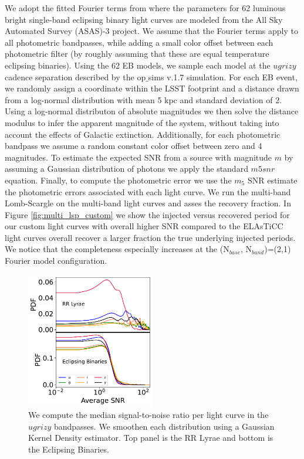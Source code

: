 \documentclass[DM,authoryear,toc]{lsstdoc}
\begin{document}
We adopt the fitted Fourier terms from \citet{Deb:Deb11} where the parameters for 62 luminous bright single-band eclipsing binary light curves are modeled from the All Sky Automated Survey
(ASAS)-3 project.
We assume that the Fourier terms apply to all photometric bandpasses, while adding a small color offset between each photometric filter (by roughly assuming that these are equal temperature eclipsing binaries).
Using the 62 EB models, we sample each model at the $ugrizy$ cadence separation described by the op$\_$sims v.1.7 simulation.
For each EB event, we randomly assign a coordinate within the LSST footprint and a distance drawn from a log-normal distribution with mean 5 kpc and standard deviation of 2.
Using a log-normal distributon of absolute magnitudes we then solve the distance modulus to infer the apparent magnitude of the system, without taking into account the effects of Galactic extinction.
Additionally, for each photometric bandpass we assume a random constant color offset between zero and 4 magnitudes.
To estimate the expected SNR from a source with magnitude $m$ by assuming a Gaussian distribution of photons we apply the standard $m5snr$ equation.
Finally, to compute the photometric error we use the $m_5$ SNR estimate the photometric errors associated with each light curve.
We run the multi-band Lomb-Scargle on the multi-band light curves and asses the recovery fraction.
In Figure \ref{fig:multi_lsp_custom} we show the injected versus recovered period for our custom light curves with overall higher SNR compared to the 
ELAsTiCC light curves overall recover a larger fraction the true underlying injected periods.
We notice that the completeness especially increases at the (N$_{base}$, N$_{band}$)=(2,1) Fourier model configuration.

\begin{figure}
  \includegraphics[width=0.5\textwidth]{figures/snr_average.pdf}
  \centering 
  \caption{We compute the median signal-to-noise ratio per light curve in the $ugrizy$ bandpasses.
 We smoothen each distribution using a Gaussian Kernel Density estimator.
Top panel is the RR Lyrae and bottom is the Eclipsing Binaries.
}
  \label{fig:snr_average}
\end{figure}
\end{document}
